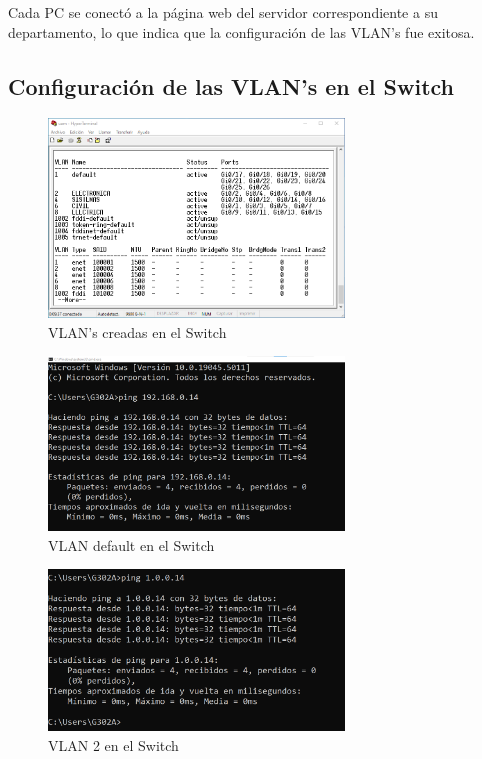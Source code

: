         Cada PC se conectó a la página web del servidor correspondiente a su departamento, lo que indica que la configuración de las VLAN's fue exitosa.

    \subsection{Configuración de las VLAN's en el Switch}
        


        \begin{figure}[H]
            \centering
            \includegraphics[width=0.7\textwidth]{img/vlansSwitch.png}
            \caption{VLAN's creadas en el Switch}
            \label{fig:vlansSwitch}
        \end{figure}

        \begin{figure}[H]
            \centering
            \includegraphics[width=0.7\textwidth]{img/ping_default.png}
            \caption{VLAN default en el Switch}
            \label{fig:ping_default}
        \end{figure}


        \begin{figure}[H]
            \centering
            \includegraphics[width=0.7\textwidth]{img/ping_vlan2.png}
            \caption{VLAN 2 en el Switch}
            \label{fig:ping_vl an2}
        \end{figure}


